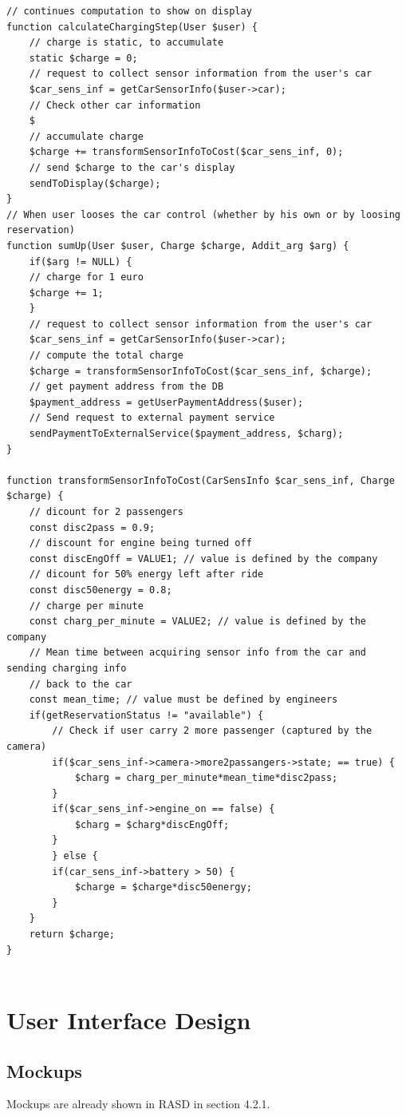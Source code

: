 \documentclass[12pt, letterpaper]{article}
\begin{document}
\begin{lstlisting}[basicstyle=\footnotesize, tabsize=1]
// continues computation to show on display
function calculateChargingStep(User $user) { 
	// charge is static, to accumulate
	static $charge = 0;
	// request to collect sensor information from the user's car
	$car_sens_inf = getCarSensorInfo($user->car);
	// Check other car information
	$
	// accumulate charge
	$charge += transformSensorInfoToCost($car_sens_inf, 0);
	// send $charge to the car's display
	sendToDisplay($charge);
}   
// When user looses the car control (whether by his own or by loosing reservation)
function sumUp(User $user, Charge $charge, Addit_arg $arg) { 
	if($arg != NULL) {
	// charge for 1 euro 
	$charge += 1;
	}
	// request to collect sensor information from the user's car
	$car_sens_inf = getCarSensorInfo($user->car);
	// compute the total charge
	$charge = transformSensorInfoToCost($car_sens_inf, $charge);
	// get payment address from the DB 
	$payment_address = getUserPaymentAddress($user);
	// Send request to external payment service
	sendPaymentToExternalService($payment_address, $charg);
}

function transformSensorInfoToCost(CarSensInfo $car_sens_inf, Charge $charge) {
	// dicount for 2 passengers
	const disc2pass = 0.9;
	// discount for engine being turned off
	const discEngOff = VALUE1; // value is defined by the company 
	// dicount for 50% energy left after ride
	const disc50energy = 0.8;
	// charge per minute
	const charg_per_minute = VALUE2; // value is defined by the company
	// Mean time between acquiring sensor info from the car and sending charging info 
	// back to the car
	const mean_time; // value must be defined by engineers
	if(getReservationStatus != "available") {
		// Check if user carry 2 more passenger (captured by the camera) 
		if($car_sens_inf->camera->more2passangers->state; == true) {
			$charg = charg_per_minute*mean_time*disc2pass;
		}
		if($car_sens_inf->engine_on == false) {
			$charg = $charg*discEngOff;
		}
		} else {
		if(car_sens_inf->battery > 50) {
			$charge = $charge*disc50energy;
		}
	}
	return $charge;
}


\end{lstlisting}

\newpage
\section{User Interface Design}
\subsection{Mockups}
Mockups are already shown in RASD in section 4.2.1.
\end{document}
